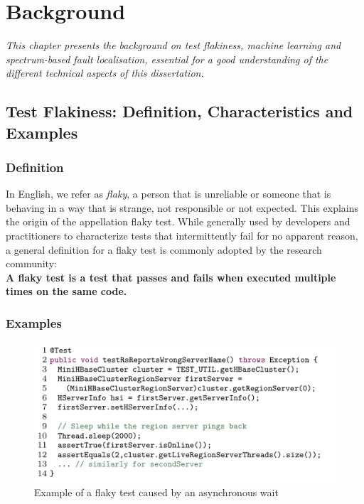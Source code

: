 \chapter{Background}
\label{chap:background}

\setcounter{minitocdepth}{1}
\justifying
\textit{
This chapter presents the background on test flakiness, machine learning and spectrum-based fault localisation, essential for a good understanding of the different technical aspects of this dissertation. 
}


\chapterPage{
}

\section{Test Flakiness: Definition, Characteristics and Examples}


\subsection{Definition}
In English, we refer as \textit{flaky}, a person that is unreliable or someone that is behaving in a way that is strange, not responsible or not expected. This explains the origin of the appellation flaky test. While generally used by developers and practitioners to characterize tests that intermittently fail for no apparent reason, a general definition for a flaky test is commonly adopted by the research community: \\ 

\textbf{A flaky test is a test that passes and fails when executed multiple times on the same code.} \\


\subsection{Examples}

\begin{figure}[ht]
\centering
\includegraphics[width=1\textwidth]{figures/core/exampleAsync.png}
\caption{Example of a flaky test caused by an asynchronous wait~\cite{Luo2014}}
\label{fig:exampleAsync}
\end{figure}

